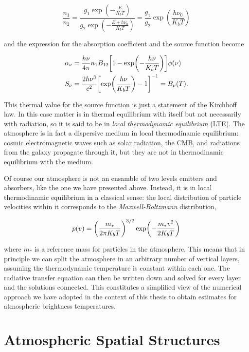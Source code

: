 \begin{equation}
        \frac{n_1}{n_2} = \frac{g_1 \exp(-\frac{E}{K_b T})}{
        g_2 \exp(-\frac{E + h\nu_0}{K_b T})} =
        \frac{g_1}{g_2} \exp(\frac{h\nu_0}{K_b T})
\end{equation}

and the expression for the absorption coefficient and the source function
become

\begin{align}
        \alpha_\nu & = \frac{h\nu}{4\pi} n_1 B_{12}
        \qty[1 - \exp(-\frac{h\nu}{K_b T})]\phi\qty(\nu)\\
        S_\nu & = \frac{2h\nu^3}{c^2}\qty[\exp(\frac{h\nu}{K_b T}) - 1]^{-1}
        = B_\nu\qty(T).
\end{align}

This thermal value for the source function is just a statement of the
Kirchhoff law. In this case matter is in thermal equilibrium with
itself but not necessarily with radiation, so it is said to be in \emph{local
thermodynamic equilibrium} (LTE). The atmosphere is in fact a dispersive
medium in local thermodinamic equilibrium: cosmic electromagnetic waves
such as solar radiation, the CMB, and radiations from the galaxy propagate
through it, but they are not in thermodinamic equilibrium with the medium.

Of course our atmosphere is not an ensamble of two levels emitters and
absorbers, like the one we have presented above. Instead, it is in local
thermodinamic equilibrium in a classical sense: the local distribution of
particle velocities within it corresponds to the \emph{Maxwell-Boltzmann}
distribution,

\begin{equation}
        p\qty(v) = \qty(\frac{m_*}{2\pi K_b T})^{3/2}
        \exp(-\frac{m_* v^2}{2 K_b T})
\end{equation}

where $m_*$ is a reference mass for particles in the atmosphere.
This means that in principle we can split the atmosphere in an arbitrary
number of vertical layers, assuming the thermodynamic temperature is
constant within each one.  The radiative transfer equation can then be
written down and solved for every layer and the solutions connected. This
constitutes a simplified view of the numerical approach we have adopted in
the context of this thesis to obtain estimates for atmospheric brightness
temperatures.

\section{Atmospheric Spatial Structures}

